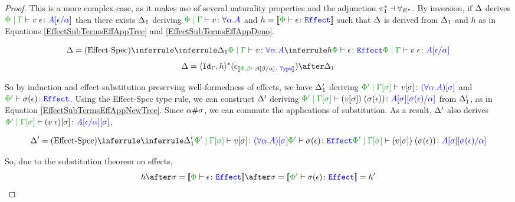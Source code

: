 \begin{framed}
\begin{proof}
    \case{\vspec}
    
    This is a more complex case, as it makes use of several naturality properties and the adjunction $\pi_1^*\dashv\forall_{E^n}$. By inversion, if $\Delta$ derives $\gpetyperelation{\eapp{v}{\e}}{A\ssub{\a}{\e}}$ then there exists $\Delta_1$ deriving $\gpetyperelation{v}{\all{\a}{A}}$ and $h = \deno{\typerelation{\P}{\e}{\effect}}$ such that $\Delta$ is derived from $\Delta_1$ and $h$ as in Equations \ref{EffectSubTermsEffAppTree} and \ref{EffectSubTermsEffAppDeno}.
    
    
    \begin{equation}\label{EffectSubTermsEffAppTree}
        \D = \ntreeruleII{\vspec}{\treeruleI{\D_1}{\gpetyperelation{v}{\all{\a}{A}}}}{\treeruleI{h}{\typerelation{\P}{\e}{\effect}}}{\gpetyperelation{\eapp{v}{\e}}{A\ssub{\a}{\e}}}
    \end{equation}
    \begin{equation}\label{EffectSubTermsEffAppDeno}
        \D = \pr{\Id{\G}}{h}\star(\e_{\deno{\typerelation{\P,\b}{A\ssub{\a}{\b}}{\type}}})\after\D_1
    \end{equation}
    
    So by induction and effect-substitution preserving well-formedness of effects, we have $\Delta_1'$ deriving $\etyperelation{\P'}{\G\ssi}{v\ssi}{(\all{\a}{A})\ssi}$ and $\wellformedeffect{\P'}{\si(\e)}$. Using the Effect-Spec type rule, we can construct $\Delta'$ deriving $\etyperelation{\P'}{\G\ssi}{\eapp{(v\ssi)}{(\si(\e))}}{A\ssi\ssub{\a}{\si(\e)}}$ from $\Delta_1'$, as in Equation \ref{EffectSubTermsEffAppNewTree}. Since $\alpha\#\sigma$, we can commute the applications of substitution. As a result, $\Delta'$ also derives $\etyperelation{\P'}{\G\ssi}{(\eapp{v}{\e})\ssi}{A\ssub{\a}{\e}\ssi}$.
    
    
    \begin{equation}
        \label{EffectSubTermsEffAppNewTree}
        \D' = \ntreeruleII{\vspec}{
        \treeruleI{\D_1'}{\etyperelation{\P'}{\G\ssi}{v\ssi}{(\all{\a}{A})\ssi}}
        }{
        \wellformedeffect{\P'}{\si(\e)}
        }{\etyperelation{\P'}{\G\ssi}{\eapp{(v\ssi)}{(\si(\e))}}{A\ssi\ssub{\a}{\si(\e)}}}
    \end{equation}
    
    
    
    So, due to the substitution theorem on effects,
    \begin{equation}
        h\after\si = \deno{\typerelation{\P}{\e}{\effect}}\after\si = \deno{\typerelation{\P'}{\si(\e)}{\effect}} = h'
    \end{equation}
    

\end{proof}
\end{framed}
